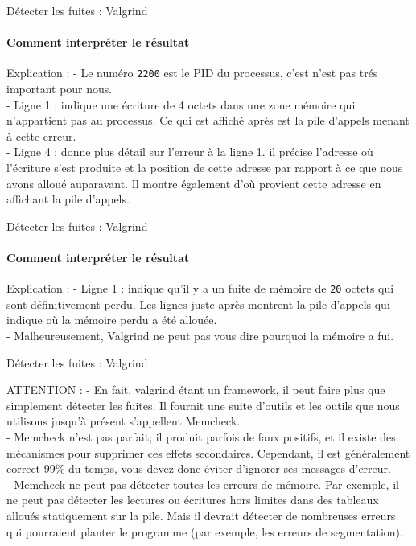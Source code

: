 \begin{frame}{Détecter les fuites : Valgrind}
	\framesubtitle{Comment interpréter le résultat}
	\begin{block}{Explication : }
		- Le numéro \texttt{2200} est le PID du processus, c'est n'est pas trés important pour nous.\\
		- \alert{Ligne 1} : indique une écriture de 4 octets dans une zone mémoire qui n'appartient pas au processus. Ce qui est affiché après est la pile d'appels menant à cette erreur. \\
		- \alert{Ligne 4} : donne plus détail sur l'erreur à la ligne 1. il précise l'adresse où l'écriture s'est produite et la position de cette adresse par rapport à ce que nous avons alloué auparavant. Il montre également d'où provient cette adresse en affichant la pile d'appels.
	\end{block}
\end{frame}


\begin{frame}{Détecter les fuites : Valgrind}
	\framesubtitle{Comment interpréter le résultat}
	\valgrindOutputTwo
	\begin{block}{Explication : }
		- \alert{Ligne 1} : indique qu'il y a un fuite de mémoire de \texttt{20} octets qui sont définitivement perdu. Les lignes juste après montrent la pile d'appels qui indique où la mémoire perdu a été allouée. \\
		- Malheureusement, Valgrind ne peut pas vous dire \alert{pourquoi} la mémoire a fui.
	\end{block}
\end{frame}

\begin{frame}{Détecter les fuites : Valgrind}
	\begin{alertblock}{ATTENTION : }
		- En fait, valgrind étant un framework, il peut faire plus que simplement détecter les fuites. Il fournit une suite d'outils et les outils que nous utilisons jusqu'à présent s'appellent \alert{Memcheck}. \\
		- \alert{Memcheck} n'est pas parfait; il produit parfois de faux positifs, et il existe des mécanismes pour supprimer ces effets secondaires. Cependant, il est généralement correct 99\% du temps, vous devez donc éviter \alert{d'ignorer} ses messages d'erreur.\\
		- \alert{Memcheck} ne peut pas détecter toutes les erreurs de mémoire. Par exemple, il ne peut pas détecter les lectures ou écritures hors limites dans des tableaux alloués statiquement sur la pile. Mais il devrait détecter de nombreuses erreurs qui pourraient planter le programme (par exemple, les erreurs de segmentation).
	\end{alertblock}
\end{frame}

